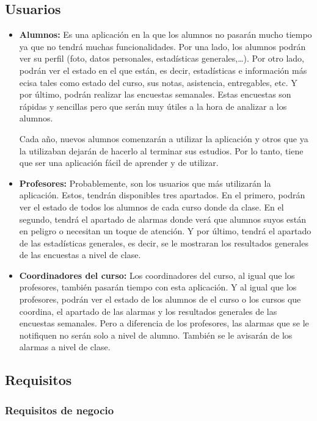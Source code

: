 \subsection{Usuarios}
\begin{itemize}
\item \textbf{Alumnos:} Es una aplicación en la que los alumnos no
  pasarán mucho tiempo ya que no tendrá muchas funcionalidades. Por
  una lado, los alumnos podrán ver su perfil (foto, datos personales,
  estadísticas generales,…). Por otro lado, podrán ver el estado en el
  que están, es decir, estadísticas e información más ecisa tales como
  estado del curso, sus notas, asistencia, entregables, etc.  Y por
  último, podrán realizar las encuestas semanales. Estas encuestas son
  rápidas y sencillas pero que serán muy útiles a la hora de analizar
  a los alumnos.

Cada año, nuevos alumnos comenzarán a utilizar la aplicación y otros
que ya la utilizaban dejarán de hacerlo al terminar sus estudios. Por
lo tanto, tiene que ser una aplicación fácil de aprender y de
utilizar.
\item \textbf{Profesores:} Probablemente, son los usuarios que más
  utilizarán la aplicación. Estos, tendrán disponibles tres
  apartados. En el primero, podrán ver el estado de todos los alumnos
  de cada curso donde da clase. En el segundo, tendrá el apartado de
  alarmas donde verá que alumnos suyos están en peligro o necesitan un
  toque de atención. Y por último, tendrá el apartado de las
  estadísticas generales, es decir, se le mostraran los resultados
  generales de las encuestas a nivel de clase.
\item \textbf{Coordinadores del curso:} Los coordinadores del curso,
  al igual que los profesores, también pasarán tiempo con esta
  aplicación. Y al igual que los profesores, podrán ver el estado de
  los alumnos de el curso o los cursos que coordina, el apartado de
  las alarmas y los resultados generales de las encuestas
  semanales. Pero a diferencia de los profesores, las alarmas que se
  le notifiquen no serán solo a nivel de alumno. También se le
  avisarán de los alarmas a nivel de clase.
\end{itemize}
\subsection{Requisitos}
\subsubsection{Requisitos de negocio}
